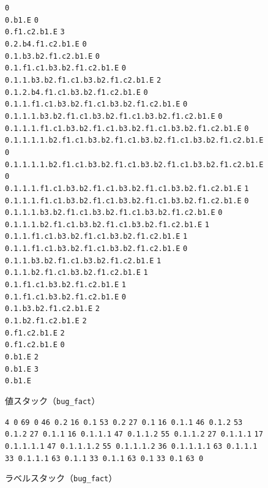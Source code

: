 \documentclass[submit,PRO]{ipsj}
\def\|{\verb|}
\begin{document}
\begin{figure}[tb]
\vbox{
\hbox{\|0                                                      0.b1.E|}
\hbox{\|0                                                0.f1.c2.b1.E|}
\hbox{\|3                                           0.2.b4.f1.c2.b1.E|}
\hbox{\|0                                        0.1.b3.b2.f1.c2.b1.E|}
\hbox{\|0                                  0.1.f1.c1.b3.b2.f1.c2.b1.E|}
\hbox{\|0                          0.1.1.b3.b2.f1.c1.b3.b2.f1.c2.b1.E|}
\hbox{\|2                             0.1.2.b4.f1.c1.b3.b2.f1.c2.b1.E|}
\hbox{\|0                    0.1.1.f1.c1.b3.b2.f1.c1.b3.b2.f1.c2.b1.E|}
\hbox{\|0            0.1.1.1.b3.b2.f1.c1.b3.b2.f1.c1.b3.b2.f1.c2.b1.E|}
\hbox{\|0      0.1.1.1.f1.c1.b3.b2.f1.c1.b3.b2.f1.c1.b3.b2.f1.c2.b1.E|}
\hbox{\|0 0.1.1.1.1.b2.f1.c1.b3.b2.f1.c1.b3.b2.f1.c1.b3.b2.f1.c2.b1.E|}
\hbox{\|0 0.1.1.1.1.b2.f1.c1.b3.b2.f1.c1.b3.b2.f1.c1.b3.b2.f1.c2.b1.E|}
\hbox{\|0      0.1.1.1.f1.c1.b3.b2.f1.c1.b3.b2.f1.c1.b3.b2.f1.c2.b1.E|}
\hbox{\|1      0.1.1.1.f1.c1.b3.b2.f1.c1.b3.b2.f1.c1.b3.b2.f1.c2.b1.E|}
\hbox{\|0            0.1.1.1.b3.b2.f1.c1.b3.b2.f1.c1.b3.b2.f1.c2.b1.E|}
\hbox{\|0               0.1.1.1.b2.f1.c1.b3.b2.f1.c1.b3.b2.f1.c2.b1.E|}
\hbox{\|1                    0.1.1.f1.c1.b3.b2.f1.c1.b3.b2.f1.c2.b1.E|}
\hbox{\|1                    0.1.1.f1.c1.b3.b2.f1.c1.b3.b2.f1.c2.b1.E|}
\hbox{\|0                          0.1.1.b3.b2.f1.c1.b3.b2.f1.c2.b1.E|}
\hbox{\|1                             0.1.1.b2.f1.c1.b3.b2.f1.c2.b1.E|}
\hbox{\|1                                  0.1.f1.c1.b3.b2.f1.c2.b1.E|}
\hbox{\|1                                  0.1.f1.c1.b3.b2.f1.c2.b1.E|}
\hbox{\|0                                        0.1.b3.b2.f1.c2.b1.E|}
\hbox{\|2                                           0.1.b2.f1.c2.b1.E|}
\hbox{\|2                                                0.f1.c2.b1.E|}
\hbox{\|2                                                0.f1.c2.b1.E|}
\hbox{\|0                                                      0.b1.E|}
\hbox{\|2                                                      0.b1.E|}
\hbox{\|3                                                      0.b1.E|}
}
\centerline{}
\caption{値スタック（\texttt{bug\_fact}）}
\label{fig:value}
\end{figure}

\begin{figure}[tb]
\vbox{
\hbox{\|4 0|}
\hbox{\|69 0|}
\hbox{\|46 0.2|}
\hbox{\|16 0.1|}
\hbox{\|53 0.2|}
\hbox{\|27 0.1|}
\hbox{\|16 0.1.1|}
\hbox{\|46 0.1.2|}
\hbox{\|53 0.1.2|}
\hbox{\|27 0.1.1|}
\hbox{\|16 0.1.1.1|}
\hbox{\|47 0.1.1.2|}
\hbox{\|55 0.1.1.2|}
\hbox{\|27 0.1.1.1|}
\hbox{\|17 0.1.1.1.1|}
\hbox{\|47 0.1.1.1.2|}
\hbox{\|55 0.1.1.1.2|}
\hbox{\|36 0.1.1.1.1|}
\hbox{\|63 0.1.1.1|}
\hbox{\|33 0.1.1.1|}
\hbox{\|63 0.1.1|}
\hbox{\|33 0.1.1|}
\hbox{\|63 0.1|}
\hbox{\|33 0.1|}
\hbox{\|63 0|}
}
\centerline{}
\caption{ラベルスタック（\texttt{bug\_fact}）}
\label{fig:label}
\end{figure}
\end{document}
